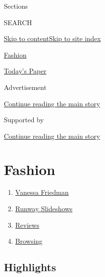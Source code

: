 Sections

SEARCH

\protect\hyperlink{site-content}{Skip to
content}\protect\hyperlink{site-index}{Skip to site index}

\href{https://www.nytimes.com/section/fashion}{Fashion}

\href{https://myaccount.nytimes.com/auth/login?response_type=cookie\&client_id=vi}{}

\href{https://www.nytimes.com/section/todayspaper}{Today's Paper}

Advertisement

\protect\hyperlink{after-top}{Continue reading the main story}

Supported by

\protect\hyperlink{after-sponsor}{Continue reading the main story}

\hypertarget{fashion}{%
\section{Fashion}\label{fashion}}

\begin{enumerate}
\def\labelenumi{\arabic{enumi}.}
\tightlist
\item
  \href{/by/vanessa-friedman}{Vanessa Friedman}
\item
  \href{/spotlight/fashion-runway-slideshows}{Runway Slideshows}
\item
  \href{/spotlight/fashion-reviews}{Reviews}
\item
  \href{/column/browsing}{Browsing}
\end{enumerate}

\hypertarget{highlights}{%
\subsection{Highlights}\label{highlights}}

